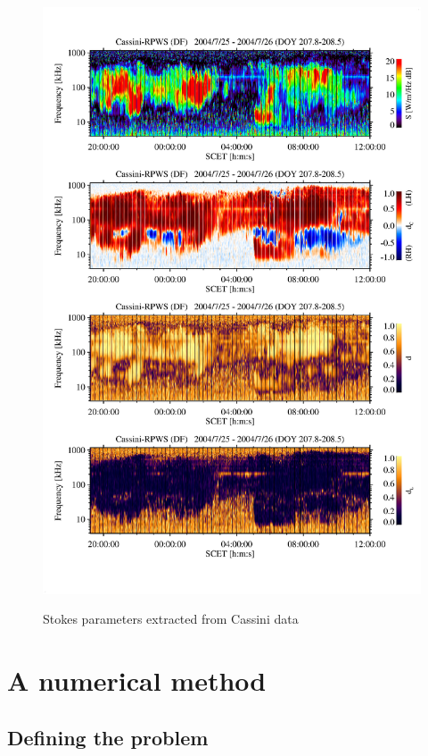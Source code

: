 \documentclass[a4paper,10pt]{thesis}
\begin{document}
\begin{figure}
  \includegraphics[width=12cm]{uli2.eps}\\
  \caption{Stokes parameters extracted from Cassini data \cite{uli1}}\label{fig_uli2}
\end{figure}


\section{\textbf{A numerical method}}

\subsection{Defining the problem}
\end{document}
